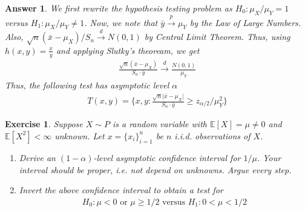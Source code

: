 \documentclass[12pt]{article}
\theoremstyle{colon}
\newtheorem{exercise}{Exercise}
\newtheorem*{answer}{Answer}
\begin{document}
\begin{answer}
  We first rewrite the hypothesis testing problem as $H_0 : \mu_X/\mu_Y = 1$ versus $H_1 : \mu_X/\mu_Y \neq 1$. Now, we note that $\bar{y} \xrightarrow{p} \mu_Y$ by the Law of Large Numbers. Also, $\sqrt{n}(\bar{x} - \mu_X)/S_n \xrightarrow{d} N(0, 1)$ by Central Limit Theorem. Thus, using $h(x, y) = \frac{x}{y}$ and applying Slutky's theoream, we get
  \begin{gather*}
    \frac{\sqrt{n}(\bar{x} - \mu_X)}{S_n \cdot \bar{y}} \xrightarrow{d} \frac{N(0, 1)}{\mu_Y}
  \end{gather*}
  Thus, the following test has asymptotic level $\alpha$
  \begin{gather*}
    T(x, y) = \{ x,y : \frac{\sqrt{n} \lvert \bar{x} - \mu_X \rvert}{S_n \cdot \bar{y}} \geq z_{\alpha/2}/\mu_Y^2 \}
  \end{gather*}
\end{answer}

\clearpage

\begin{exercise}
  Suppose $X \sim P$ is a random variable with $\mathbb{E}[X] = \mu \neq 0$ and $\mathbb{E}[X^2] < \infty$ unknown. Let $x = \{ x_i \}_{i=1}^n$ be $n$ i.i.d. observations of $X$.
  \begin{enumerate}[label=\arabic*)]
    \item Derive an $(1-\alpha)$-level asymptotic confidence interval for $1/\mu$. Your interval should be proper, i.e. not depend on unknowns. Argue every step.
    \item Invert the above confidence interval to obtain a test for
      \begin{gather*}
        H_0 : \mu < 0 \text{ or } \mu \geq 1/2 \text{ versus } H_1 : 0 < \mu < 1/2
      \end{gather*}
  \end{enumerate}
\end{exercise}
\end{document}
